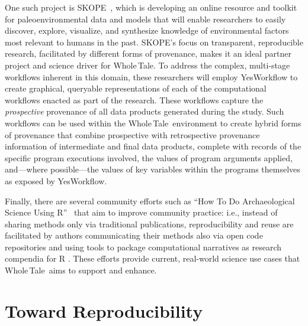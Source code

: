 \documentclass[review]{elsarticle}
\newcommand{\wt}{Whole\,Tale}
\begin{document}
One such project is SKOPE~\cite{skope}, which is developing an online resource and toolkit for paleoenvironmental data and models that will enable researchers to easily discover, explore, visualize, and synthesize knowledge of environmental factors most relevant to humans in the past. SKOPE's focus on transparent, reproducible research, facilitated by different forms of provenance, makes it an ideal partner project and science driver for \wt.
To address the complex, multi-stage workflows inherent in this domain, these researchers will employ YesWorkflow \cite{mcphillips_yesworkflow:_2015,mcphillips2015retrospective} to create graphical, queryable representations of each of the computational workflows enacted as part of the research. These workflows capture the \emph{prospective} provenance of all data products generated during the study. Such workflows can be used within the \wt\ environment to create hybrid forms of provenance \cite{pimentel2016yin,zhang17revealing} that combine prospective with retrospective provenance information of intermediate and final data products, complete with records of the specific program executions involved, the values of program arguments applied, and---where possible---the values of key variables within the programs themselves as exposed by YesWorkflow.

Finally, there are several community efforts such as ``How To Do Archaeological Science Using R''~\cite{archR} that aim to improve community practice: i.e., instead of sharing methods only via traditional  publications, reproducibility and reuse are facilitated by authors communicating their methods also via open code repositories and using tools to package computational narratives as research compendia for R \cite{marwick2017packaging,bocinsky17provathon}. These efforts provide current, real-world science use cases that \wt\ aims to support and enhance.

\section{Toward Reproducibility}\label{sec:reproducibility}
\end{document}
